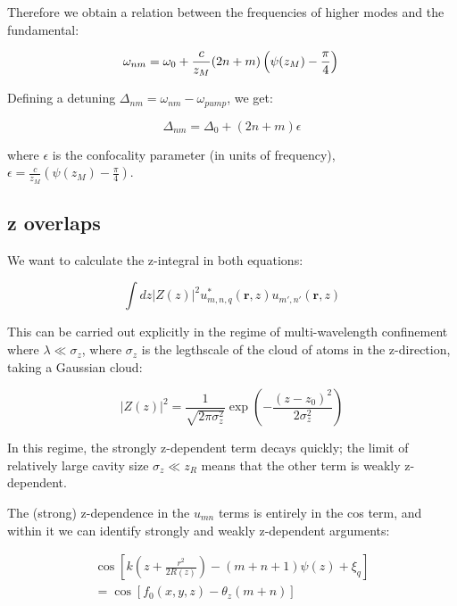 \documentclass[a4paper,twocolumn,nobalancelastpage]{revtex4-1}
\newcommand{\vect}[1]{\mathbf{#1}}
\begin{document}
Therefore we obtain a relation between the frequencies of higher modes and the fundamental:

\begin{equation}
\omega_{nm}=\omega_0+ \frac{c}{z_M}
(2n+m)\left(\psi(z_M)-\frac{\pi}{4}\right) \nonumber \nonumber \\
\end{equation}

Defining a detuning $\Delta_{nm}=\omega_{nm}-\omega_{pump}$, we get:

\begin{equation}
\Delta_{nm}=\Delta_0+(2n+m)\epsilon
\end{equation}

where $\epsilon$ is the confocality parameter (in units of frequency), $\epsilon=\frac{c}{z_M} \left(\psi(z_M)-\frac{\pi}{4}\right)$.

\subsection{z overlaps}
\label{sec:zoverlaps}

We want to calculate the z-integral in both equations:

\begin{equation}
\int dz |Z(z)|^2 u^*_{m,n,q}(\vect{r},z) u_{m',n'}(\vect{r},z)
\end{equation}

This can be carried out explicitly in the regime of multi-wavelength confinement where $\lambda \ll \sigma_z$, where $\sigma_z$ is the legthscale of the cloud of atoms in the z-direction, taking a Gaussian cloud:

\begin{equation}
|Z(z)|^2=\frac{1}{\sqrt{2 \pi \sigma_z^2}} \exp{ \left(- \frac{(z-z_0)^2}{2\sigma_z^2}\right)}
\end{equation}

In this regime, the strongly z-dependent term decays quickly; the limit of relatively large cavity size $\sigma_z \ll z_R$ means that the other term is weakly z-dependent.

The (strong) z-dependence in the $u_{mn}$ terms is entirely in the cos term, and within it we can identify strongly and weakly z-dependent arguments:

\begin{multline}
 \cos \left[
    k \left( z + \frac{r^2}{2R(z)} \right) - (m+n+1) \psi(z) + \xi_{q} \right] \\ = 
  \cos \left[ f_0 (x,y,z) - \theta_z (m+n) \right]
\end{multline}
\end{document}
